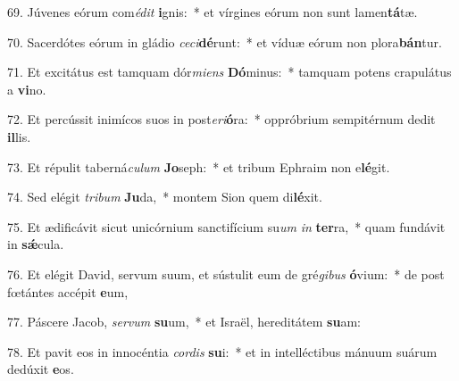 69. Júvenes eórum com\textit{é}\textit{dit} \textbf{i}gnis:~*  et vírgines eórum non sunt lamen\textbf{tá}tæ.\

70. Sacerdótes eórum in gládio \textit{ce}\textit{ci}\textbf{dé}runt:~*  et víduæ eórum non plora\textbf{bán}tur.\

71. Et excitátus est tamquam dór\textit{mi}\textit{ens} \textbf{Dó}minus:~*  tamquam potens crapulátus a \textbf{vi}no.\

72. Et percússit inimícos suos in post\textit{e}\textit{ri}\textbf{ó}ra:~*  oppróbrium sempitérnum dedit \textbf{il}lis.\

73. Et répulit taberná\textit{cu}\textit{lum} \textbf{Jo}seph:~*  et tribum Ephraim non e\textbf{lé}git.\

74. Sed elégit \textit{tri}\textit{bum} \textbf{Ju}da,~*  montem Sion quem di\textbf{lé}xit.\

75. Et ædificávit sicut unicórnium sanctifícium su\textit{um} \textit{in} \textbf{ter}ra,~*  quam fundávit in \textbf{sǽ}cula.\

76. Et elégit David, servum suum, et sústulit eum de gré\textit{gi}\textit{bus} \textbf{ó}vium:~*  de post fœtántes accépit \textbf{e}um,\

77. Páscere Jacob, \textit{ser}\textit{vum} \textbf{su}um,~*  et Israël, hereditátem \textbf{su}am:\

78. Et pavit eos in innocéntia \textit{cor}\textit{dis} \textbf{su}i:~*  et in intelléctibus mánuum suárum dedúxit \textbf{e}os.\

